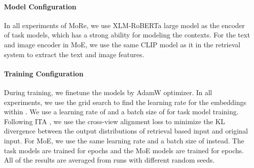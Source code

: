 \documentclass[11pt]{article}
\begin{document}
\paragraph{Model Configuration}
In all experiments of MoRe, we use XLM-RoBERTa large \citep[XLMR;][]{conneau-etal-2020-unsupervised} model as the encoder of task models, which has a strong ability for modeling the contexts. For the text and image encoder in MoE, we use the same CLIP model as it in the retrieval system to extract the text and image features.


\paragraph{Training Configuration}
During training, we finetune the models by AdamW \citep{loshchilov2018decoupled} optimizer. In all experiments, we use the grid search to find the learning rate for the embeddings within . We use a learning rate of  and a batch size of  for task model training. Following ITA \citep{wang2022ita}, we use the cross-view alignment loss to minimize the KL divergence between the output distributions of retrieval based input and original input. For MoE, we use the same learning rate and a batch size of  instead. The task models are trained for  epochs and the MoE models are trained for  epochs. All of the results are averaged from  runs with different random seeds.
\end{document}
